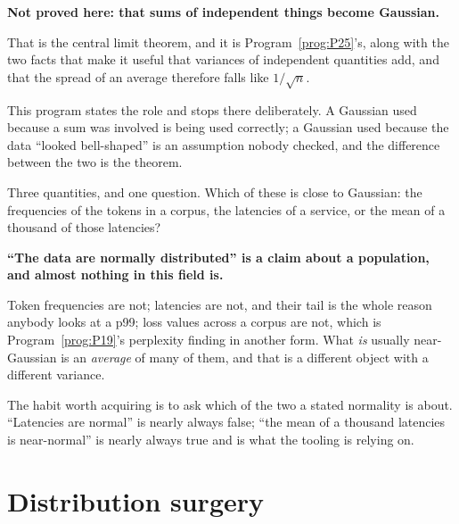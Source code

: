 \begin{fr}
\begin{rigourbox}
\textbf{Not proved here: that sums of independent things become Gaussian.}

That is the central limit theorem, and it is Program~\ref{prog:P25}'s, along
with the two facts that make it useful \dash{} that variances of independent
quantities add, and that the spread of an average therefore falls like
$1/\sqrt{n}$.

This program states the role and stops there deliberately. A Gaussian used
because a sum was involved is being used correctly; a Gaussian used because
the data \enquote{looked bell-shaped} is an assumption nobody checked, and the
difference between the two is the theorem.
\end{rigourbox}
\end{fr}

\begin{fr}
Three quantities, and one question. Which of these is close to Gaussian:
the frequencies of the tokens in a corpus, the latencies of a service, or the
mean of a thousand of those latencies?
\dotline
\nextframe
\end{fr}

\begin{fr}

\begin{trapbox}
\textbf{\enquote{The data are normally distributed} is a claim about a
population, and almost nothing in this field is.}

Token frequencies are not; latencies are not, and their tail is the whole
reason anybody looks at a p99; loss values across a corpus are not, which is
Program~\ref{prog:P19}'s perplexity finding in another form. What \emph{is}
usually near-Gaussian is an \emph{average} of many of them, and that is a
different object with a different variance.

The habit worth acquiring is to ask which of the two a stated normality is
about. \enquote{Latencies are normal} is nearly always false;
\enquote{the mean of a thousand latencies is near-normal} is nearly always
true and is what the tooling is relying on.
\end{trapbox}
\end{fr}

\section{Distribution surgery}
\label{sec:P24-surgery}

